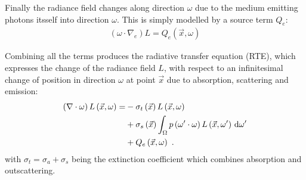 
Finally the radiance field changes along direction $\omega$ due to the medium emitting photons itsself into direction $\omega$. This is simply modelled by a source term $Q_e$:
\begin{align}
\left(\omega\cdot\nabla_{e}\right)L = Q_e\left(\vec{x}, \omega\right)
\end{align}

Combining all the terms produces the radiative transfer equation (RTE), which expresses the change of the radiance field $L$, with respect to an infinitesimal change of position in direction $\omega$ at point $\vec{x}$ due to absorption, scattering and emission:
\begin{align}
\left(\nabla\cdot\omega\right)L\left(\vec{x}, \omega \right)
=&
-\sigma_t\left(\vec{x}\right) L\left(\vec{x}, \omega \right)\nonumber\\
&
+\sigma_s\left(\vec{x}\right) \int_{\Omega}
{
p\left(\omega'\cdot\omega\right)L\left(\vec{x}, \omega' \right)\,\mathrm{d}\omega'
}
\label{eq:rte}
\\
&
+Q_e\left(\vec{x}, \omega\right)
\nonumber
\  .
\end{align}
with $\sigma_t=\sigma_a+\sigma_s$ being the extinction coefficient which combines absorption and outscattering.

